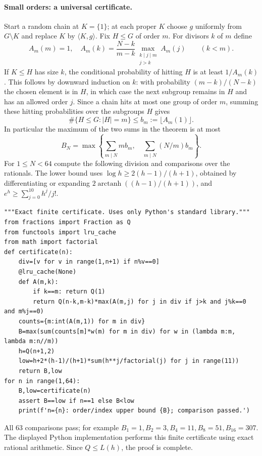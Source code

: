 \documentclass[11pt,a4paper]{article}
\numberwithin{equation}{section}
\theoremstyle{definition}
\theoremstyle{remark}
\begin{document}
\paragraph{Small orders: a universal certificate.}
Start a random chain at $K=\{1\}$; at each proper $K$ choose $g$ uniformly from $G\setminus K$ and replace $K$ by $\langle K,g\rangle$. Fix $H\le G$ of order $m$. For divisors $k$ of $m$ define
\[
 A_m(m)=1,\quad
 A_m(k)=\frac{N-k}{m-k}
 \max_{\substack{k\mid j\mid m\\j>k}} A_m(j)\qquad(k<m).
\]
If $K\le H$ has size $k$, the conditional probability of hitting $H$ is at least $1/A_m(k)$. This follows by downward induction on $k$: with probability $(m-k)/(N-k)$ the chosen element is in $H$, in which case the next subgroup remains in $H$ and has an allowed order $j$. Since a chain hits at most one group of order $m$, summing these hitting probabilities over the subgroups $H$ gives
\[
 \#\{H\le G:|H|=m\}\le b_m:=\lfloor A_m(1)\rfloor .
\]
In particular the maximum of the two sums in the theorem is at most
\[
 B_N=\max\left\{\sum_{m\mid N} m b_m,\quad
                         \sum_{m\mid N}(N/m)b_m\right\}.
\]
For $1\le N<64$ compute the following division and comparisons over the rationals. The lower bound uses $\log h\ge 2(h-1)/(h+1)$, obtained by differentiating or expanding $2\operatorname{arctanh}((h-1)/(h+1))$, and $e^h\ge\sum_{j=0}^{10} h^j/j!$.
{\small
\begin{Verbatim}
"""Exact finite certificate. Uses only Python's standard library."""
from fractions import Fraction as Q
from functools import lru_cache
from math import factorial
def certificate(n):
    div=[v for v in range(1,n+1) if n%v==0]
    @lru_cache(None)
    def A(m,k):
        if k==m: return Q(1)
        return Q(n-k,m-k)*max(A(m,j) for j in div if j>k and j%k==0 and m%j==0)
    counts={m:int(A(m,1)) for m in div}
    B=max(sum(counts[m]*w(m) for m in div) for w in (lambda m:m, lambda m:n//m))
    h=Q(n+1,2)
    low=h+2*(h-1)/(h+1)*sum(h**j/factorial(j) for j in range(11))
    return B,low
for n in range(1,64):
    B,low=certificate(n)
    assert B==low if n==1 else B<low
    print(f'n={n}: order/index upper bound {B}; comparison passed.')
\end{Verbatim}

}

All 63 comparisons pass; for example $B_1=1,B_2=3,B_4=11,B_8=51,B_{16}=307$. The displayed Python implementation performs this finite certificate using exact rational arithmetic. Since $Q\le L(h)$, the proof is complete.
\end{document}
